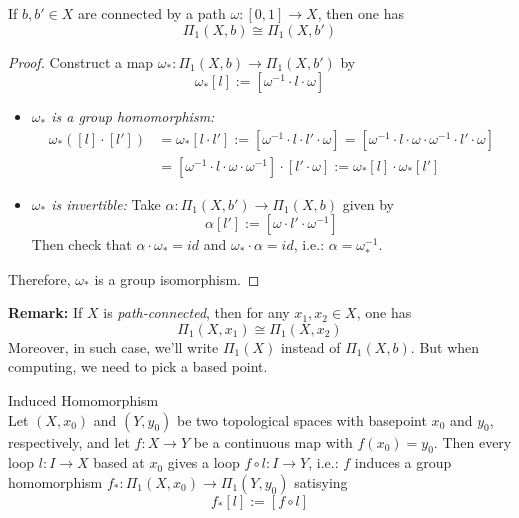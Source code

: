 \begin{proposition}
    If $b,b' \in X$ are connected by a path $\omega : [0,1] \rightarrow X$, then one has
    $$\Pi_1 (X,b) \cong \Pi_1 (X,b')$$
\end{proposition}

\begin{proof}
    Construct a map $\omega_* : \Pi_1(X,b) \rightarrow \Pi_1(X,b')$ by
    $$\omega_* [l] := [\omega^{-1} \cdot l \cdot \omega]$$
    \begin{itemize}
        \item \textit{$\omega_*$ is a group homomorphism:}
        \begin{align*}
            \omega_* ([l] \cdot [l']) &= \omega_*[l \cdot l'] := [\omega^ {-1} \cdot l \cdot l' \cdot \omega] = [\omega^ {-1} \cdot l \cdot \omega \cdot \omega^{-1} \cdot l' \cdot \omega]\\
            &= [\omega^ {-1} \cdot l \cdot \omega \cdot \omega^{-1}] \cdot [l' \cdot \omega] := \omega_*[l] \cdot \omega_*[l']
        \end{align*}
        \item \textit{$\omega_*$ is invertible:} Take $\alpha : \Pi_1 (X,b') \rightarrow \Pi_1 (X,b)$ given by
        $$\alpha [l'] := [\omega \cdot l' \cdot \omega^{-1}]$$
        Then check that $\alpha \cdot \omega_* =id$ and $ \omega_* \cdot \alpha = id$, i.e.: $\alpha = \omega_*^{-1}$.
    \end{itemize}
    Therefore, $\omega_*$ is a group isomorphism.
\end{proof}

\noindent\textbf{Remark:} If $X$ is \textit{path-connected}, then for any $x_1,x_2 \in X$, one has
$$\Pi_1 (X, x_1) \cong \Pi_1 (X,x_2)$$
Moreover, in such case, we'll write $\Pi_1(X)$ instead of $\Pi_1 (X,b)$. But when computing, we need to pick a based point.

\begin{definition}{Induced Homomorphism}\\
Let $(X,x_0)$ and $(Y,y_0)$ be two topological spaces with basepoint $x_0$ and $y_0$, respectively, and let $f : X \rightarrow Y$ be a continuous map with $f(x_0) = y_0$. Then every loop $l : I\rightarrow X$ based at $x_0$ gives a loop $f \circ l: I \rightarrow Y$, i.e.: $f$ induces a group homomorphism $f_*: \Pi_1 (X,x_0) \rightarrow \Pi_1 (Y, y_0)$ satisying
$$f_* [l] := [f \circ l]$$
\end{definition}

